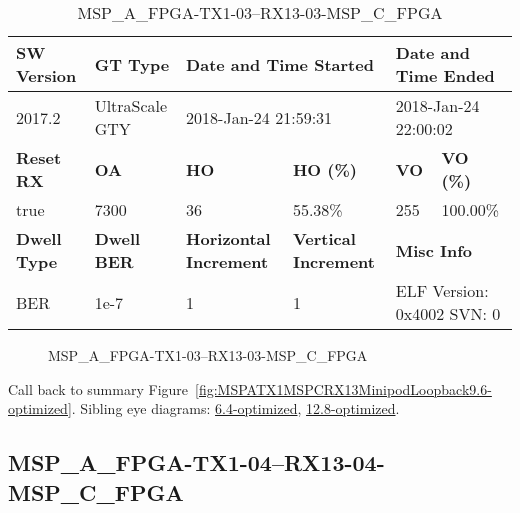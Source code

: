 \begin{table}[h]
\centering
\caption{MSP\_A\_FPGA-TX1-03--RX13-03-MSP\_C\_FPGA}
\label{tab:MSPAFPGATX103RX1303MSPCFPGA9.6-optimized}
\begin{tabular}{@{}|l|l|l|l|l|l|@{}}
\toprule
\textbf{SW Version}                & \textbf{GT Type}   & \multicolumn{2}{l|}{\textbf{Date and Time Started}}            & \multicolumn{2}{l|}{\textbf{Date and Time Ended}}        \\ \midrule
2017.2                       & UltraScale GTY          & \multicolumn{2}{l|}{2018-Jan-24 21:59:31}                   & \multicolumn{2}{l|}{2018-Jan-24 22:00:02}               \\ \midrule
\textbf{Reset RX}                  & \textbf{OA} & \textbf{HO}   & \textbf{HO (\%)} & \textbf{VO} & \textbf{VO (\%)} \\ \midrule
true & 7300        & 36          & 55.38\%        & 255        & 100.00\%       \\ \midrule
\textbf{Dwell Type}                & \textbf{Dwell BER} & \textbf{Horizontal Increment} & \textbf{Vertical Increment}    & \multicolumn{2}{l|}{\textbf{Misc Info}}                  \\ \midrule
BER                            & 1e-7        & 1        & 1           & \multicolumn{2}{l|}{ELF Version: 0x4002 SVN: 0}                         \\ \bottomrule
\end{tabular}
\end{table}

\begin{figure}[h]
\caption{MSP\_A\_FPGA-TX1-03--RX13-03-MSP\_C\_FPGA} \label{fig:MSPAFPGATX103RX1303MSPCFPGA9.6-optimized}
\end{figure}

Call back to summary Figure~\ref{fig:MSPATX1MSPCRX13MinipodLoopback9.6-optimized}.
Sibling eye diagrams: \hyperref[sec:MSPAFPGATX103RX1303MSPCFPGA6.4-optimized]{6.4-optimized}, \hyperref[sec:MSPAFPGATX103RX1303MSPCFPGA12.8-optimized]{12.8-optimized}.

\clearpage
\newpage


\subsection{MSP\_A\_FPGA-TX1-04--RX13-04-MSP\_C\_FPGA}\label{sec:MSPAFPGATX104RX1304MSPCFPGA9.6-optimized}

